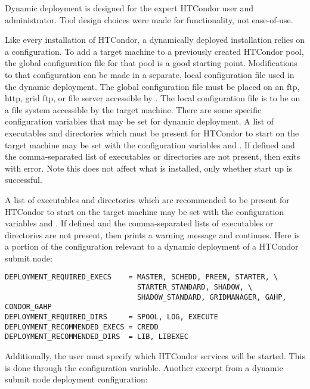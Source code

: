 Dynamic deployment is designed for the expert HTCondor user
and administrator.
Tool design choices were made for functionality,
not ease-of-use.

Like every installation of HTCondor, a dynamically deployed installation
relies on a configuration.
To add a target
machine to a previously created HTCondor pool,
the global configuration file for that pool is a good starting point.
Modifications to that configuration can be made in a separate, 
local configuration file used in the dynamic deployment.
The global configuration file must
be placed on an ftp, http, grid ftp, or file server 
accessible by .  The local configuration file
is to be on a file system accessible by the target machine.
There are some specific configuration variables that may be set for
dynamic deployment.  
A list of executables and directories which must be present
for HTCondor to start on the target machine may be set with
the configuration variables  and
. 
If defined and the comma-separated list of executables or directories are
not present, then  exits with error.
Note this does not affect what is installed, only
whether start up is successful. 

A list of executables and directories which are recommended to be present
for HTCondor to start on the target machine may be set with
the configuration variables  and
. 
If defined and the comma-separated lists of executables or directories are
not present, then  prints a warning message
and continues.
Here is a portion of the configuration relevant to
a dynamic deployment of a HTCondor submit node:

\footnotesize
\begin{verbatim}
DEPLOYMENT_REQUIRED_EXECS    = MASTER, SCHEDD, PREEN, STARTER, \
                               STARTER_STANDARD, SHADOW, \
                               SHADOW_STANDARD, GRIDMANAGER, GAHP, CONDOR_GAHP
DEPLOYMENT_REQUIRED_DIRS     = SPOOL, LOG, EXECUTE
DEPLOYMENT_RECOMMENDED_EXECS = CREDD
DEPLOYMENT_RECOMMENDED_DIRS  = LIB, LIBEXEC
\end{verbatim}
\normalsize

Additionally, the user must
specify which HTCondor services will be started.  This is done through
the \MacroNI{DAEMON\_LIST} configuration variable.  Another excerpt
from a dynamic submit node deployment configuration:


